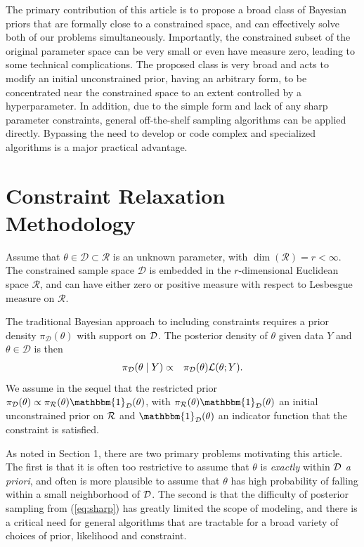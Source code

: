 \documentclass[10pt,fleqn]{article}
\DeclareMathOperator{\1}{\mathbbm{1}} \DeclareMathOperator{\bigO}{\mc O}
\begin{document}
The primary contribution of this article is to propose a broad class of Bayesian priors that are formally close to a constrained space, and can effectively solve both of our problems simultaneously.  Importantly, the constrained subset of the original parameter space can be very small or even have measure
zero, leading to some technical complications.  The proposed class is very broad and 
acts to modify an initial unconstrained prior, having an arbitrary form, to be concentrated near
the constrained space to an extent controlled by a hyperparameter.  In addition, due to the simple form and lack of any sharp parameter constraints, general off-the-shelf sampling algorithms can be applied directly.  
Bypassing the need to develop or code complex and specialized algorithms is a major practical advantage.




\section{Constraint Relaxation Methodology}

Assume that $\theta \in \mathcal{D} \subset \mathcal{R}$ is an unknown parameter, 
with $\dim(\mathcal{R})=r < \infty$.  The constrained sample space $\mathcal{D}$ is 
embedded in the $r$-dimensional Euclidean space $\mathcal{R}$, and can have 
either zero or positive measure with respect to Lesbesgue measure on $\mathcal{R}$.  

The traditional Bayesian approach to including constraints requires a
prior density $\pi_\mathcal{D}(\theta)$ with support on $\mathcal{D}$. The posterior density of $\theta$
given data $Y$ and $\theta \in \mathcal{D}$ is then
\begin{eqnarray}
\pi_{\mc D}(\theta \mid  Y) %
& \propto & \pi_\mathcal{D}(\theta)\mathcal{L}(\theta; Y). \label{eq:sharp}
\end{eqnarray}
We assume in the sequel that the restricted prior $\pi_\mathcal{D}(\theta) \propto 
\pi_{\mc R}(\theta)\mathbbm{1}_{\mc D}(\theta)$, with $\pi_{\mc R}(\theta)\mathbbm{1}_{\mc D}(\theta)$
an initial unconstrained prior on ${\mathcal{R}}$ and $\mathbbm{1}_{\mc D}(\theta)$ an indicator
function that the constraint is satisfied.

As noted in Section 1, there are two primary problems motivating this article.  The first is that it is often
too restrictive to assume that $\theta$ is {\em exactly} within ${\mathcal{D}}$ {\em a priori}, and often is more plausible to assume that $\theta$ has high probability of falling within a small neighborhood of ${\mathcal{D}}$.
The second is that the difficulty of posterior sampling from (\ref{eq:sharp}) has greatly limited the scope of modeling, and there is a critical need for general algorithms that are tractable for a broad variety of choices of prior, likelihood and constraint.
\end{document}

